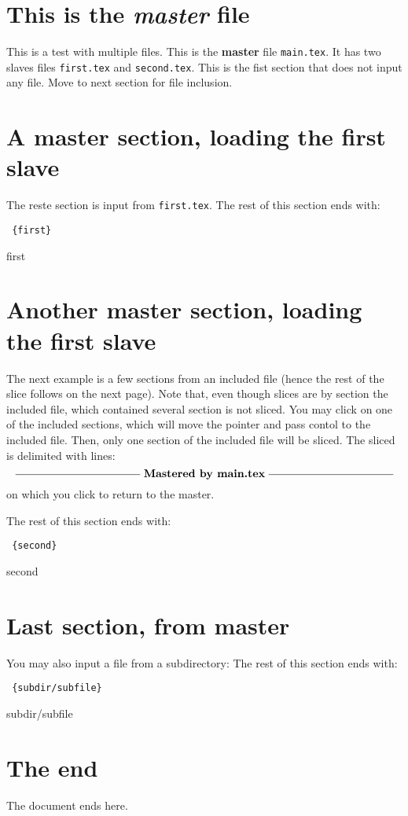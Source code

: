 \documentclass{article}
\begin{document}
\section {This is the {\em master} file}
   
This is a test with multiple files.  
This  is the {\bf master} file \verb"main.tex".   
It has two slaves files \verb"first.tex" and \verb"second.tex". 
This is the fist section that does not input any file.
Move to next section for file inclusion.

\section {A master section, loading the first slave} 

The reste section is input from \texttt{first.tex}.
The rest of this section ends with:
\begin{verbatim}
 {first}   
\end{verbatim}
 {first}   


 
\section {Another master section, loading the first slave}

The next example is a few sections from an included file (hence the rest of
the slice follows on the next page). Note that, even though slices are by
section the included file, which contained several section is not sliced.
You may click on one of the included sections, which will move the pointer
and pass contol to the included file. Then, only one section of the
included file will be sliced. The sliced is delimited with lines: 
$$
\centerline{\hrulefill\space \lower 0.5ex \hbox{\bf Mastered by main.tex}
\hrulefill}
$$
on which you click to return to the master. 

The rest of this section ends with:
\begin{verbatim}
 {second}
\end{verbatim}
 {second}

\section {Last section, from master}

You may also input a file from a subdirectory: 
The rest of this section ends with:
\begin{verbatim}
 {subdir/subfile}
\end{verbatim}
 {subdir/subfile}

\section{The end}
The document ends here. 
\end{document}
